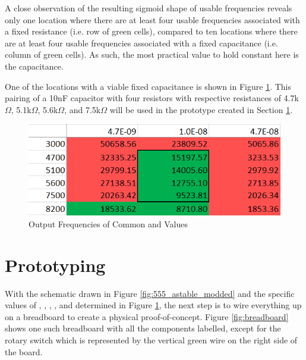 A close observation of the resulting sigmoid shape of usable
frequencies reveals only one location where there are at least four
usable frequencies associated with a fixed resistance (i.e. row of
green cells), compared to ten locations where there are at least four
usable frequencies associated with a fixed capacitance (i.e. column of
green cells). As such, the most practical value to hold constant here
is the capacitance.

One of the locations with a viable fixed capacitance is shown in Figure
\ref{fig:freq-selection-r}. This pairing of a 10nF capacitor with four
resistors with respective resistances of 4.7k$\Omega$, 5.1k$\Omega$,
5.6k$\Omega$, and 7.5k$\Omega$ will be used in the prototype created in
Section \ref{sec:prototype}.

\begin{figure}[h]
    \centering
    \caption{Output Frequencies of Common  and  Values}
    \label{fig:freq-selection-r}
    \includegraphics[width=0.8\linewidth]{Figures/6 PCB Design/freq_selection_r.png}
\end{figure}


\newpage
\section{Prototyping}
\label{sec:prototype}

With the schematic drawn in Figure \ref{fig:555_astable_modded} and the
specific values of , , , , and
 determined in Figure \ref{fig:freq-selection-r}, the next
step is to wire everything up on a breadboard to create a physical
proof-of-concept. Figure \ref{fig:breadboard} shows one such breadboard
with all the components labelled, except for the rotary switch which is
represented by the vertical green wire on the right side of the board.

